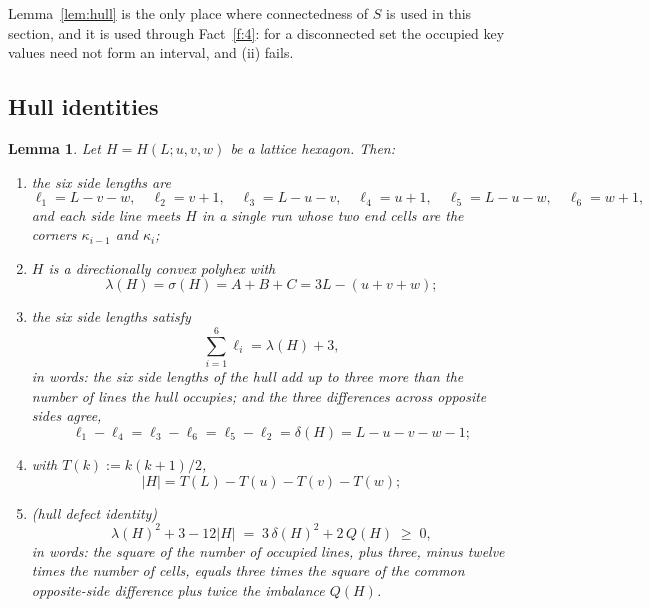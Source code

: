 \documentclass[11pt]{article}
\theoremstyle{plain}
\newtheorem{lemma}[theorem]{Lemma}
\theoremstyle{definition}
\theoremstyle{remark}
\begin{document}
Lemma~\ref{lem:hull} is the only place where connectedness of \(S\) is used in this
section, and it is used through Fact~\ref{f:4}: for a disconnected set the occupied key
values need not form an interval, and (ii) fails.

\subsection{Hull identities}\label{sec:2.5}

\begin{lemma}\label{lem:hex}
Let \(H=H(L;u,v,w)\) be a lattice hexagon. Then:
\begin{enumerate}
\item[(i)] the six side lengths are
\[
   \ell_{1}=L-v-w,\quad \ell_{2}=v+1,\quad \ell_{3}=L-u-v,\quad
   \ell_{4}=u+1,\quad \ell_{5}=L-u-w,\quad \ell_{6}=w+1 ,
\]
and each side line meets \(H\) in a single run whose two end cells are the corners
\(\kappa_{i-1}\) and \(\kappa_{i}\);
\item[(ii)] \(H\) is a directionally convex polyhex with
\[
   \lambda(H)=\sigma(H)=A+B+C=3L-(u+v+w);
\]
\item[(iii)] the six side lengths satisfy
\begin{equation}\label{eq:sidesum}
   \sum_{i=1}^{6}\ell_{i}=\lambda(H)+3 ,
\end{equation}
in words: the six side lengths of the hull add up to three more than the number of lines
the hull occupies; and the three differences across opposite sides agree,
\begin{equation}\label{eq:delta}
   \ell_{1}-\ell_{4}=\ell_{3}-\ell_{6}=\ell_{5}-\ell_{2}=\delta(H)=L-u-v-w-1 ;
\end{equation}
\item[(iv)] with \(T(k):=k(k+1)/2\),
\[
   |H|=T(L)-T(u)-T(v)-T(w) ;
\]
\item[(v)] \textup{(hull defect identity)}
\begin{equation}\label{eq:defectid}
   \lambda(H)^{2}+3-12|H| \;=\; 3\,\delta(H)^{2}+2\,Q(H)\;\ge\;0 ,
\end{equation}
in words: the square of the number of occupied lines, plus three, minus twelve times the
number of cells, equals three times the square of the common opposite-side difference plus
twice the imbalance \(Q(H)\).
\end{enumerate}
\end{lemma}
\end{document}
